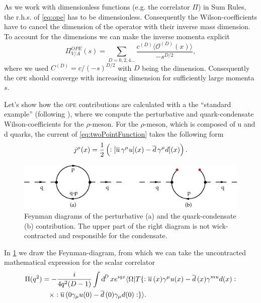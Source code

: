 \documentclass[../../index.tex]{subfiles}
\begin{document}
As we work with dimensionless functions (e.g. the correlator $\Pi$) in Sum Rules, the r.h.s. of
\cref{eq:ope} has to be dimensionless. Consequently the Wilson-coefficients have
to cancel the dimension of the operator with their inverse mass dimension. To
account for the dimensions we can make the inverse momenta explicit
\begin{equation}
  \Pi_{V/A}^{OPE}(s) = \sum_{D=0,2,4\dots} \frac{c^{(D)} \langle \mathcal{O}^{(D)}(x) \rangle}{-s^{D/2}},
\end{equation}
where we used $C^{(D)}=c/(-s)^{D/2}$ with $D$ being the dimension. Consequently
the \textsc{ope} should converge with increasing dimension for sufficiently large momenta
$s$.

Let's show how the \textsc{ope} contributions are calculated with a the ``standard
example'' (following \cite{Pascual1984}), where we compute the perturbative and
quark-condensate Wilson-coefficients for the $\rho$-meson. For the $\rho$-meson,
which is composed of u and d quarks, the current of \cref{eq:twoPointFunction}
takes the following form
\begin{equation}
  j^\mu(x) = \frac{1}{2}\left(:[\overline{u}\, \gamma^\mu u](x) - \overline{d}\, \gamma^\mu d](x)\right).
\end{equation}
\begin{figure}
  \centering
  \includegraphics[width=\textwidth]{./images/condensateFeynmanDiagram.eps}
  \caption{Feynman diagrams of the perturbative (a) and the quark-condensate (b)
    contribution. The upper part of the right diagram is not wick-contracted and
    responsible for the condensate.}
  \label{fig:OPEFeynmanDiagram}
\end{figure}
In \cref{fig:OPEFeynmanDiagram} we draw the Feynman-diagram, from which we can
take the uncontracted mathematical expression for the scalar correlator
\begin{equation}
  \begin{split}
    \Pi(q^2) &= - \frac{i}{4 q^2 (D -1)} \int \dif^D x e^{iqx} \langle \Omega | T \{:\anti{u}(x) \gamma^\mu u(x) - \anti{d}(x) \gamma^{mu} d(x): \\
    &\quad\times :\anti{u}(0 \gamma_\mu u(0) - \anti{d}(0)\gamma_\mu d(0): \}
    \rangle.
  \end{split}
\end{equation}
\end{document}
